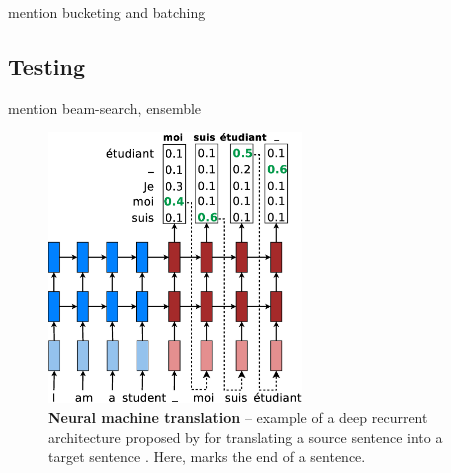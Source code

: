 mention bucketing and batching

\subsection{Testing}

mention beam-search, ensemble

\begin{figure}[tbh!]
\centering
\includegraphics[width=0.6\textwidth, clip=true, trim= 0 0 0
0]{img/nmt_test.eps} %
\caption[Neural machine translation]{{\bf Neural machine translation} -- example of a deep recurrent
architecture proposed by  for
translating a source sentence  into a target sentence
. Here, \word{\texttt{\_}} marks the end of a sentence.
} 
\label{f:nmt_details}
\end{figure}


%


